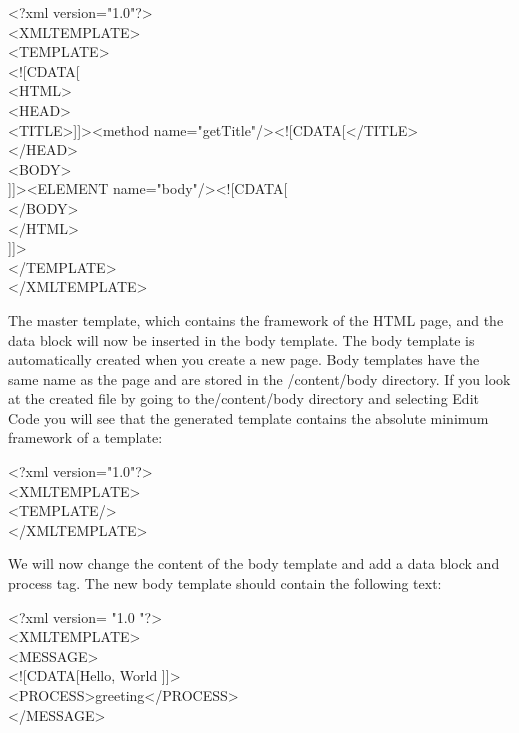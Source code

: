 \begin{xml}
<?xml version="1.0"?>\\
<XMLTEMPLATE>\\
<TEMPLATE>\\
\xtaba  <![CDATA[\\
\xtaba  <HTML>\\
\xtabb    <HEAD>\\
\xtabb    <TITLE>]]><method name="getTitle"/><![CDATA[</TITLE>\\
\xtabb    </HEAD>\\
\xtabb    <BODY>\\
\xtabb    ]]><ELEMENT name="body"/><![CDATA[\\
\xtabb    </BODY>\\
\xtaba  </HTML>\\
\xtaba  ]]>\\
</TEMPLATE>\\
</XMLTEMPLATE>\\
\end{xml}

The master template, which contains the framework of the HTML page, and
the data block will now be inserted in the body template. The body
template is automatically created when you create a new page. Body
templates have the same name as the page and are stored in the
{\dir /content/body} directory. If you look at the created file by going to
the{\dir /content/body} directory and selecting {\name Edit Code} you will see that
the generated template contains the absolute minimum framework of a
template:

\begin{xml}
<?xml version="1.0"?>\\
<XMLTEMPLATE>\\
<TEMPLATE/>\\
</XMLTEMPLATE>\\
\end{xml}

We will now change the content of the body template and add a data
block and process tag. The new body template should contain the
following text:

\begin{xml}
<?xml version= "1.0 "?>\\
<XMLTEMPLATE>\\
<MESSAGE>\\
<![CDATA[Hello, World ]]>\\
<PROCESS>greeting</PROCESS>\\
</MESSAGE>\\
\end{xml}

